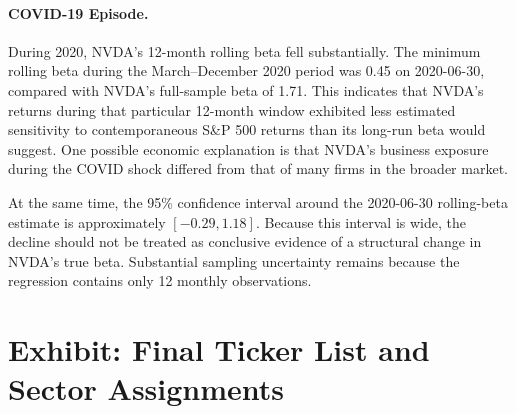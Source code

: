 \documentclass[11pt]{article}
\begin{document}
\paragraph{COVID-19 Episode.} During 2020, NVDA's 12-month rolling beta fell substantially. The minimum rolling beta during the March--December 2020 period was 0.45 on 2020-06-30, compared with NVDA's full-sample beta of 1.71. This indicates that NVDA's returns during that particular 12-month window exhibited less estimated sensitivity to contemporaneous S\&P 500 returns than its long-run beta would suggest. One possible economic explanation is that NVDA's business exposure during the COVID shock differed from that of many firms in the broader market.

At the same time, the 95\% confidence interval around the 2020-06-30 rolling-beta estimate is approximately $[-0.29, 1.18]$. Because this interval is wide, the decline should not be treated as conclusive evidence of a structural change in NVDA's true beta. Substantial sampling uncertainty remains because the regression contains only 12 monthly observations.

\section*{Exhibit: Final Ticker List and Sector Assignments}
\end{document}
